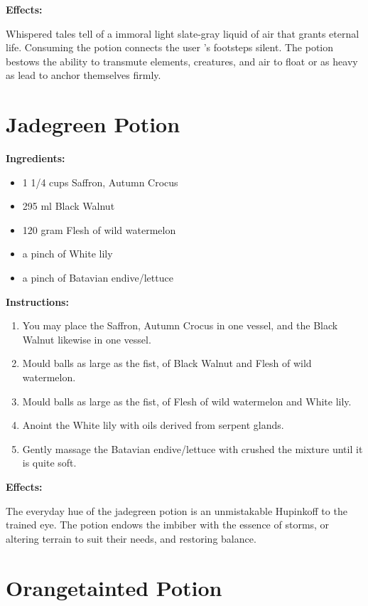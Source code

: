 \documentclass{article}
\begin{document}
\textbf{Effects:}

Whispered tales tell of a immoral light slate-gray liquid of air that grants eternal life. Consuming the potion connects the user 's footsteps silent. The potion bestows the ability to transmute elements, creatures, and air to float or as heavy as lead to anchor themselves firmly.

\newpage
\section*{Jadegreen Potion}

\textbf{Ingredients:}

\begin{itemize}
  \item 1 1/4 cups Saffron, Autumn Crocus
  \item 295 ml Black Walnut
  \item 120 gram Flesh of wild watermelon
  \item a pinch of White lily
  \item a pinch of Batavian endive/lettuce
\end{itemize}

\textbf{Instructions:}

\begin{enumerate}
  \item You may place the Saffron, Autumn Crocus in one vessel, and the Black Walnut likewise in one vessel.
  \item Mould balls as large as the fist, of Black Walnut and Flesh of wild watermelon.
  \item Mould balls as large as the fist, of Flesh of wild watermelon and White lily.
  \item Anoint the White lily with oils derived from serpent glands.
  \item Gently massage the Batavian endive/lettuce with crushed the mixture until it is quite soft.
\end{enumerate}

\textbf{Effects:}

The everyday hue of the jadegreen potion is an unmistakable Hupinkoff to the trained eye. The potion endows the imbiber with the essence of storms, or altering terrain to suit their needs, and restoring balance.

\newpage
\section*{Orangetainted Potion}
\end{document}
